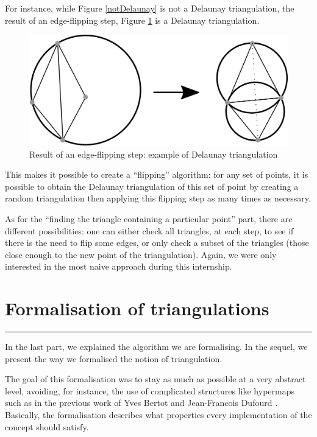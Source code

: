 \documentclass[a4paper,10pt]{article}
\begin{document}
For instance, while Figure \ref{notDelaunay} is not a Delaunay triangulation, the result of an edge-flipping step, Figure \ref{DelaunayTriangulation} is a Delaunay triangulation.
\begin{figure}
\centering
\includegraphics[scale=1]{dessin1}
\caption{\label{DelaunayTriangulation} Result of an edge-flipping step: example of Delaunay triangulation}
\end{figure}
This makes it possible to create a ``flipping'' algorithm: for any set of points, it is possible to obtain the Delaunay triangulation of this set of point by creating a random triangulation then applying this flipping step as many times as necessary.

As for the ``finding the triangle containing a particular point'' part, there are different possibilities: one can either check all triangles, at each step, to see if there is the need to flip some edges, or only check a subset of the triangles (those close enough to the new point of the triangulation). Again, we were only interested in the most naive approach during this internship.
\section{Formalisation of triangulations}
\rule{\linewidth}{0.5pt}
\label{formalisation}

In the last part, we explained the algorithm we are formalising. In the sequel, we present the way we formalised the notion of triangulation.

The goal of this formalisation was to stay as much as possible at a very abstract level, avoiding, for instance, the use of complicated structures like hypermaps such as in the previous work of Yves Bertot and Jean-Francois Dufourd \cite{Bertot}. Basically, the formalisation describes what properties every implementation of the concept should satisfy.
\end{document}
